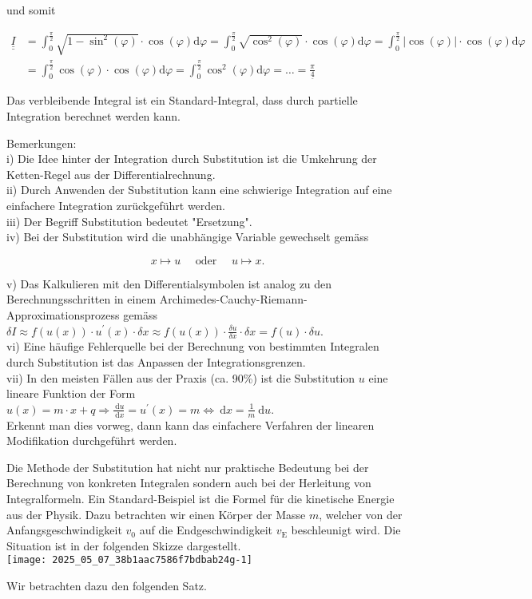 \documentclass[10pt]{article}
\begin{document}
und somit


\begin{align*}
\underline{\underline{I}} & =\int_{0}^{\frac{\pi}{2}} \sqrt{1-\sin ^{2}(\varphi)} \cdot \cos (\varphi) \mathrm{d} \varphi=\int_{0}^{\frac{\pi}{2}} \sqrt{\cos ^{2}(\varphi)} \cdot \cos (\varphi) \mathrm{d} \varphi=\int_{0}^{\frac{\pi}{2}}|\cos (\varphi)| \cdot \cos (\varphi) \mathrm{d} \varphi \\
& =\int_{0}^{\frac{\pi}{2}} \cos (\varphi) \cdot \cos (\varphi) \mathrm{d} \varphi=\int_{0}^{\frac{\pi}{2}} \cos ^{2}(\varphi) \mathrm{d} \varphi=\ldots=\frac{\pi}{\underline{4}} \tag{3.14}
\end{align*}


Das verbleibende Integral ist ein Standard-Integral, dass durch partielle Integration berechnet werden kann.

Bemerkungen:\\
i) Die Idee hinter der Integration durch Substitution ist die Umkehrung der Ketten-Regel aus der Differentialrechnung.\\
ii) Durch Anwenden der Substitution kann eine schwierige Integration auf eine einfachere Integration zurückgeführt werden.\\
iii) Der Begriff Substitution bedeutet "Ersetzung".\\
iv) Bei der Substitution wird die unabhängige Variable gewechselt gemäss


\begin{equation*}
x \mapsto u \quad \text { oder } \quad u \mapsto x . \tag{3.15}
\end{equation*}


v) Das Kalkulieren mit den Differentialsymbolen ist analog zu den Berechnungsschritten in einem Archimedes-Cauchy-Riemann-Approximationsprozess gemäss\\
$\delta I \approx f(u(x)) \cdot u^{\prime}(x) \cdot \delta x \approx f(u(x)) \cdot \frac{\delta u}{\delta x} \cdot \delta x=f(u) \cdot \delta u$.\\
vi) Eine häufige Fehlerquelle bei der Berechnung von bestimmten Integralen durch Substitution ist das Anpassen der Integrationsgrenzen.\\
vii) In den meisten Fällen aus der Praxis (ca. 90\%) ist die Substitution $u$ eine lineare Funktion der Form\\
$u(x)=m \cdot x+q \Rightarrow \frac{\mathrm{~d} u}{\mathrm{~d} x}=u^{\prime}(x)=m \Leftrightarrow \mathrm{~d} x=\frac{1}{m} \mathrm{~d} u$.\\
Erkennt man dies vorweg, dann kann das einfachere Verfahren der linearen Modifikation durchgeführt werden.

Die Methode der Substitution hat nicht nur praktische Bedeutung bei der Berechnung von konkreten Integralen sondern auch bei der Herleitung von Integralformeln. Ein Standard-Beispiel ist die Formel für die kinetische Energie aus der Physik. Dazu betrachten wir einen Körper der Masse $m$, welcher von der Anfangsgeschwindigkeit $v_{0}$ auf die Endgeschwindigkeit $v_{\mathrm{E}}$ beschleunigt wird. Die Situation ist in der folgenden Skizze dargestellt.\\
\texttt{[image: 2025\_05\_07\_38b1aac7586f7bdbab24g-1]}

Wir betrachten dazu den folgenden Satz.
\end{document}
